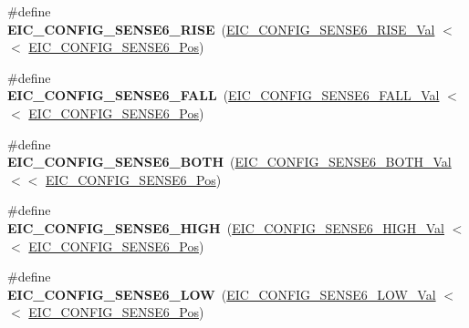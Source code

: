 \begin{DoxyCompactItemize}
\item 
\hypertarget{group___s_a_m_l21___e_i_c_ga53c04777fd42c073f8f1bed777c89e26}{}\#define {\bfseries E\+I\+C\+\_\+\+C\+O\+N\+F\+I\+G\+\_\+\+S\+E\+N\+S\+E6\+\_\+\+R\+I\+S\+E}~(\hyperlink{group___s_a_m_l21___e_i_c_ga6a5001e8379757251033150764c6dcba}{E\+I\+C\+\_\+\+C\+O\+N\+F\+I\+G\+\_\+\+S\+E\+N\+S\+E6\+\_\+\+R\+I\+S\+E\+\_\+\+Val}    $<$$<$ \hyperlink{group___s_a_m_l21___e_i_c_ga17d194da98be0777ff750650293d386d}{E\+I\+C\+\_\+\+C\+O\+N\+F\+I\+G\+\_\+\+S\+E\+N\+S\+E6\+\_\+\+Pos})\label{group___s_a_m_l21___e_i_c_ga53c04777fd42c073f8f1bed777c89e26}

\item 
\hypertarget{group___s_a_m_l21___e_i_c_gad0772048f10199d34db19472fc416e23}{}\#define {\bfseries E\+I\+C\+\_\+\+C\+O\+N\+F\+I\+G\+\_\+\+S\+E\+N\+S\+E6\+\_\+\+F\+A\+L\+L}~(\hyperlink{group___s_a_m_l21___e_i_c_gaa3b18a5b6647f583a1b276ad9b5aa4d6}{E\+I\+C\+\_\+\+C\+O\+N\+F\+I\+G\+\_\+\+S\+E\+N\+S\+E6\+\_\+\+F\+A\+L\+L\+\_\+\+Val}    $<$$<$ \hyperlink{group___s_a_m_l21___e_i_c_ga17d194da98be0777ff750650293d386d}{E\+I\+C\+\_\+\+C\+O\+N\+F\+I\+G\+\_\+\+S\+E\+N\+S\+E6\+\_\+\+Pos})\label{group___s_a_m_l21___e_i_c_gad0772048f10199d34db19472fc416e23}

\item 
\hypertarget{group___s_a_m_l21___e_i_c_ga7b8a2ab45d8e40ff1cbedf8222a0d691}{}\#define {\bfseries E\+I\+C\+\_\+\+C\+O\+N\+F\+I\+G\+\_\+\+S\+E\+N\+S\+E6\+\_\+\+B\+O\+T\+H}~(\hyperlink{group___s_a_m_l21___e_i_c_ga30183c55bdd242f2e73f8e9510c3208a}{E\+I\+C\+\_\+\+C\+O\+N\+F\+I\+G\+\_\+\+S\+E\+N\+S\+E6\+\_\+\+B\+O\+T\+H\+\_\+\+Val}    $<$$<$ \hyperlink{group___s_a_m_l21___e_i_c_ga17d194da98be0777ff750650293d386d}{E\+I\+C\+\_\+\+C\+O\+N\+F\+I\+G\+\_\+\+S\+E\+N\+S\+E6\+\_\+\+Pos})\label{group___s_a_m_l21___e_i_c_ga7b8a2ab45d8e40ff1cbedf8222a0d691}

\item 
\hypertarget{group___s_a_m_l21___e_i_c_gaa288bee325b96239efcae0546b82b7bf}{}\#define {\bfseries E\+I\+C\+\_\+\+C\+O\+N\+F\+I\+G\+\_\+\+S\+E\+N\+S\+E6\+\_\+\+H\+I\+G\+H}~(\hyperlink{group___s_a_m_l21___e_i_c_ga308809e49e6d8ddd024e96f22f1cf72c}{E\+I\+C\+\_\+\+C\+O\+N\+F\+I\+G\+\_\+\+S\+E\+N\+S\+E6\+\_\+\+H\+I\+G\+H\+\_\+\+Val}    $<$$<$ \hyperlink{group___s_a_m_l21___e_i_c_ga17d194da98be0777ff750650293d386d}{E\+I\+C\+\_\+\+C\+O\+N\+F\+I\+G\+\_\+\+S\+E\+N\+S\+E6\+\_\+\+Pos})\label{group___s_a_m_l21___e_i_c_gaa288bee325b96239efcae0546b82b7bf}

\item 
\hypertarget{group___s_a_m_l21___e_i_c_gaa7f53acd84244664504de0dcd73d1bf3}{}\#define {\bfseries E\+I\+C\+\_\+\+C\+O\+N\+F\+I\+G\+\_\+\+S\+E\+N\+S\+E6\+\_\+\+L\+O\+W}~(\hyperlink{group___s_a_m_l21___e_i_c_ga3df3d29ae144b0c1d5b95a4f898fb78d}{E\+I\+C\+\_\+\+C\+O\+N\+F\+I\+G\+\_\+\+S\+E\+N\+S\+E6\+\_\+\+L\+O\+W\+\_\+\+Val}     $<$$<$ \hyperlink{group___s_a_m_l21___e_i_c_ga17d194da98be0777ff750650293d386d}{E\+I\+C\+\_\+\+C\+O\+N\+F\+I\+G\+\_\+\+S\+E\+N\+S\+E6\+\_\+\+Pos})\label{group___s_a_m_l21___e_i_c_gaa7f53acd84244664504de0dcd73d1bf3}


\end{DoxyCompactItemize}
